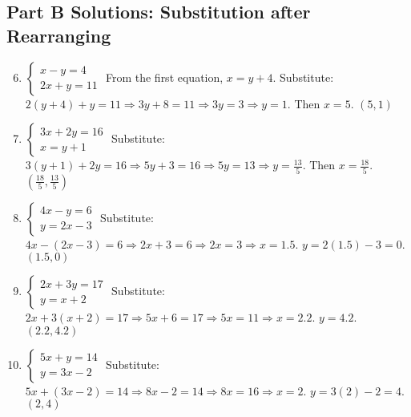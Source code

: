 \documentclass[12pt]{article}
\begin{document}
\subsection*{Part B Solutions: Substitution after Rearranging}
\begin{enumerate}
    \setcounter{enumi}{5}
    \item \(\begin{cases} x - y = 4 \\ 2x + y = 11 \end{cases}\)  
    From the first equation, \(x = y + 4\).  
    Substitute: \(2(y + 4) + y = 11 \Rightarrow 3y + 8 = 11 \Rightarrow 3y = 3 \Rightarrow y = 1\).  
    Then \(x = 5\).  
    \(\boxed{(5, 1)}\)

    \item \(\begin{cases} 3x + 2y = 16 \\ x = y + 1 \end{cases}\)  
    Substitute: \(3(y + 1) + 2y = 16 \Rightarrow 5y + 3 = 16 \Rightarrow 5y = 13 \Rightarrow y = \tfrac{13}{5}\).  
    Then \(x = \tfrac{18}{5}\).  
    \(\boxed{(\tfrac{18}{5}, \tfrac{13}{5})}\)

    \item \(\begin{cases} 4x - y = 6 \\ y = 2x - 3 \end{cases}\)  
    Substitute: \(4x - (2x - 3) = 6 \Rightarrow 2x + 3 = 6 \Rightarrow 2x = 3 \Rightarrow x = 1.5\).  
    \(y = 2(1.5) - 3 = 0\).  
    \(\boxed{(1.5, 0)}\)

    \item \(\begin{cases} 2x + 3y = 17 \\ y = x + 2 \end{cases}\)  
    Substitute: \(2x + 3(x + 2) = 17 \Rightarrow 5x + 6 = 17 \Rightarrow 5x = 11 \Rightarrow x = 2.2\).  
    \(y = 4.2\).  
    \(\boxed{(2.2, 4.2)}\)

    \item \(\begin{cases} 5x + y = 14 \\ y = 3x - 2 \end{cases}\)  
    Substitute: \(5x + (3x - 2) = 14 \Rightarrow 8x - 2 = 14 \Rightarrow 8x = 16 \Rightarrow x = 2\).  
    \(y = 3(2) - 2 = 4\).  
    \(\boxed{(2, 4)}\)
\end{enumerate}
\end{document}
